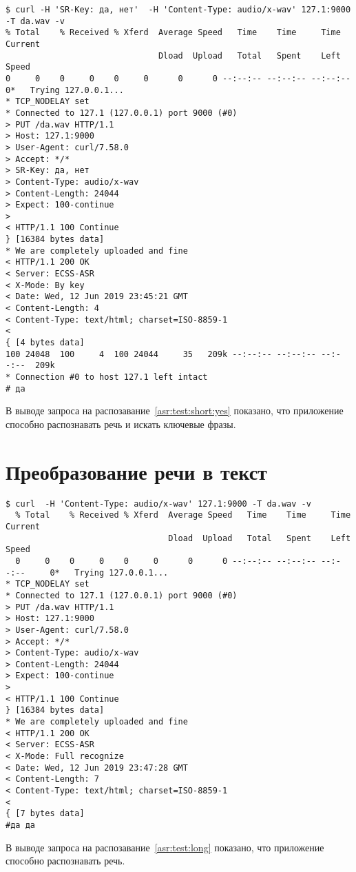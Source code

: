 \begin{lstlisting}[caption={Поиск по ключевым фразам: да, нет}, label={asr:test:short:yes}]
$ curl -H 'SR-Key: да, нет'  -H 'Content-Type: audio/x-wav' 127.1:9000 -T da.wav -v
% Total    % Received % Xferd  Average Speed   Time    Time     Time  Current
                               Dload  Upload   Total   Spent    Left  Speed
0     0    0     0    0     0      0      0 --:--:-- --:--:-- --:--:--     0*   Trying 127.0.0.1...
* TCP_NODELAY set
* Connected to 127.1 (127.0.0.1) port 9000 (#0)
> PUT /da.wav HTTP/1.1
> Host: 127.1:9000
> User-Agent: curl/7.58.0
> Accept: */*
> SR-Key: да, нет
> Content-Type: audio/x-wav
> Content-Length: 24044
> Expect: 100-continue
>
< HTTP/1.1 100 Continue
} [16384 bytes data]
* We are completely uploaded and fine
< HTTP/1.1 200 OK
< Server: ECSS-ASR
< X-Mode: By key
< Date: Wed, 12 Jun 2019 23:45:21 GMT
< Content-Length: 4
< Content-Type: text/html; charset=ISO-8859-1
<
{ [4 bytes data]
100 24048  100     4  100 24044     35   209k --:--:-- --:--:-- --:--:--  209k
* Connection #0 to host 127.1 left intact
# да

\end{lstlisting}

В выводе запроса на распозавание~\ref{asr:test:short:yes} показано, что приложение
способно распознавать речь и искать ключевые фразы.


\section{Преобразование речи в текст}
\begin{lstlisting}[caption={Преобразование речи в текст}, label={asr:test:long}]
$ curl  -H 'Content-Type: audio/x-wav' 127.1:9000 -T da.wav -v
  % Total    % Received % Xferd  Average Speed   Time    Time     Time  Current
                                 Dload  Upload   Total   Spent    Left  Speed
  0     0    0     0    0     0      0      0 --:--:-- --:--:-- --:--:--     0*   Trying 127.0.0.1...
* TCP_NODELAY set
* Connected to 127.1 (127.0.0.1) port 9000 (#0)
> PUT /da.wav HTTP/1.1
> Host: 127.1:9000
> User-Agent: curl/7.58.0
> Accept: */*
> Content-Type: audio/x-wav
> Content-Length: 24044
> Expect: 100-continue
>
< HTTP/1.1 100 Continue
} [16384 bytes data]
* We are completely uploaded and fine
< HTTP/1.1 200 OK
< Server: ECSS-ASR
< X-Mode: Full recognize
< Date: Wed, 12 Jun 2019 23:47:28 GMT
< Content-Length: 7
< Content-Type: text/html; charset=ISO-8859-1
<
{ [7 bytes data]
#да да
\end{lstlisting}


В выводе запроса на распозавание~\ref{asr:test:long} показано, что приложение
способно распознавать речь.
